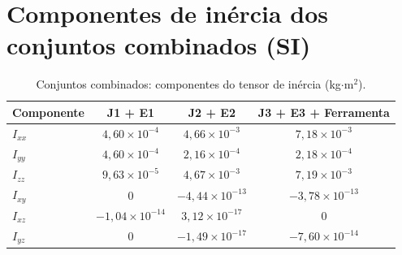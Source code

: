 \section{Componentes de inércia dos conjuntos combinados (SI)}
\label{sec:apB_inercias_combinadas}


\begin{table}[H]
\centering
\caption{Conjuntos combinados: componentes do tensor de inércia (kg$\cdot$m$^2$).}
\label{tab_perseguidor_I_combinados_SI}
\begin{tabular}{lccc}
\hline
\textbf{Componente} & \textbf{J1 + E1} & \textbf{J2 + E2} & \textbf{J3 + E3 + Ferramenta} \\
\hline
$I_{xx}$ & $4,60\times 10^{-4}$ & $4,66\times 10^{-3}$ & $7,18\times 10^{-3}$ \\
$I_{yy}$ & $4,60\times 10^{-4}$ & $2,16\times 10^{-4}$ & $2,18\times 10^{-4}$ \\
$I_{zz}$ & $9,63\times 10^{-5}$ & $4,67\times 10^{-3}$ & $7,19\times 10^{-3}$ \\
$I_{xy}$ & $0$ & $-4,44\times 10^{-13}$ & $-3,78\times 10^{-13}$ \\
$I_{xz}$ & $-1,04\times 10^{-14}$ & $3,12\times 10^{-17}$ & $0$ \\
$I_{yz}$ & $0$ & $-1,49\times 10^{-17}$ & $-7,60\times 10^{-14}$ \\
\hline
\end{tabular}
\end{table}


